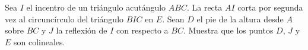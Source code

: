 Sea $I$ el incentro de un triángulo acutángulo $ABC$. La recta $AI$ corta por segunda vez al
circuncírculo del triángulo $BIC$ en $E$. Sean $D$ el pie de la altura desde $A$ sobre $BC$ y $J$
la reflexión de $I$ con respecto a $BC$. Muestra que los puntos $D$, $J$ y $E$ son colineales.